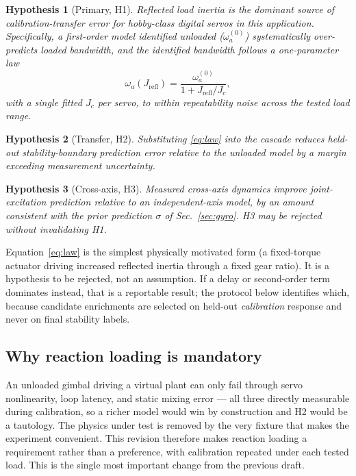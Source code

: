 \documentclass[11pt,a4paper]{article}
\newtheorem{hypothesis}{Hypothesis}
\begin{document}
\begin{hypothesis}[Primary, H1]\label{h1}
Reflected load inertia is the dominant source of calibration-transfer error for hobby-class digital
servos in this application. Specifically, a first-order model identified unloaded
($\omega_a^{(0)}$) systematically over-predicts loaded bandwidth, and the identified bandwidth
follows a one-parameter law
\begin{equation}\label{eq:law}
\omega_a(J_{\text{refl}}) = \frac{\omega_a^{(0)}}{1+J_{\text{refl}}/J_c},
\end{equation}
with a single fitted $J_c$ per servo, to within repeatability noise across the tested load range.
\end{hypothesis}

\begin{hypothesis}[Transfer, H2]\label{h2}
Substituting \eqref{eq:law} into the cascade reduces held-out stability-boundary prediction error
relative to the unloaded model by a margin exceeding measurement uncertainty.
\end{hypothesis}

\begin{hypothesis}[Cross-axis, H3]\label{h3}
Measured cross-axis dynamics improve joint-excitation prediction relative to an independent-axis
model, by an amount consistent with the prior prediction $\sigma$ of Sec.~\ref{sec:gyro}. H3 may be
rejected without invalidating H1.
\end{hypothesis}

Equation~\eqref{eq:law} is the simplest physically motivated form (a fixed-torque actuator driving
increased reflected inertia through a fixed gear ratio). It is a hypothesis to be rejected, not an
assumption. If a delay or second-order term dominates instead, that is a reportable result; the
protocol below identifies which, because candidate enrichments are selected on held-out
\emph{calibration} response and never on final stability labels.

\subsection{Why reaction loading is mandatory}

An unloaded gimbal driving a virtual plant can only fail through servo nonlinearity, loop latency,
and static mixing error --- all three directly measurable during calibration, so a richer model would
win by construction and H2 would be a tautology. The physics under test is removed by the very
fixture that makes the experiment convenient. This revision therefore makes reaction loading a
requirement rather than a preference, with calibration repeated under each tested load. This is the
single most important change from the previous draft.
\end{document}
